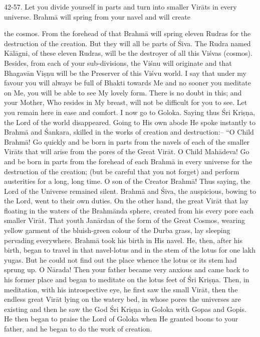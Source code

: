 42-57. Let you divide yourself in parts and turn into smaller Vir\=ats in every universe. Brahm\=a will spring from your navel and will create

the cosmos. From the forehead of that Brahm\=a will spring eleven Rudras for the destruction of the creation. But they will all be parts of \'Siva. The Rudra named K\=al\=agni, of these eleven Rudras, will be the destroyer of all this Vi\'svas (cosmos). Besides, from each of your sub-divisions, the Vi\'snu will originate and that Bhagav\=an Vi\d{s}\d{n}u will be the Preserver of this Vi\'svu world. I say that under my favour you will always be full of Bhakti towards Me and no sooner you meditate on Me, you will be able to see My lovely form. There is no doubt in this; and your Mother, Who resides in My breast, will not be difficult for you to see. Let you remain here in ease and comfort. I now go to Goloka. Saying thus \'Sri Kri\d{s}\d{n}a, the Lord of the world disappeared. Going to His own abode He spoke instantly to Brahm\=a and \'Sankara, skilled in the works of creation and destruction:-- ``O Child Brahm\=a! Go quickly and be born in parts from the navels of each of the smaller Vir\=ats that will arise from the pores of the Great Vir\=at. O Child Mah\=adeva! Go and be born in parts from the forehead of each Brahm\=a in every universe for the destruction of the creation; (but be careful that you not forget) and perform austerities for a long, long time. O son of the Creator Brahm\=a! Thus saying, the Lord of the Universe remained silent. Brahm\=a and \'Siva, the auspicious, bowing to the Lord, went to their own duties. On the other hand, the great Vir\=at that lay floating in the waters of the Brahm\=anda sphere, created from his every pore each smaller Vir\=at. That youth Jan\=ardan of the form of the Great Cosmos, wearing yellow garment of the bluish-green colour of the Durba grass, lay sleeping pervading everywhere. Brahm\=a took his birth in His navel. He, then, after his birth, began to travel in that navel-lotus and in the stem of the lotus for one lakh yugas. But he could not find out the place whence the lotus or its stem had sprung up. O N\=arada! Then your father became very anxious and came back to his former place and began to meditate on the lotus feet of \'Sri Kri\d{s}\d{n}a. Then, in meditation, with his introspective eye, he first saw the small Vir\=at, then the endless great Vir\=at lying on the watery bed, in whose pores the universes are existing and then he saw the God \'Sri Kri\d{s}\d{n}a in Goloka with Gopas and Gopis. He then began to praise the Lord of Goloka when He granted boons to your father, and he began to do the work of creation.


